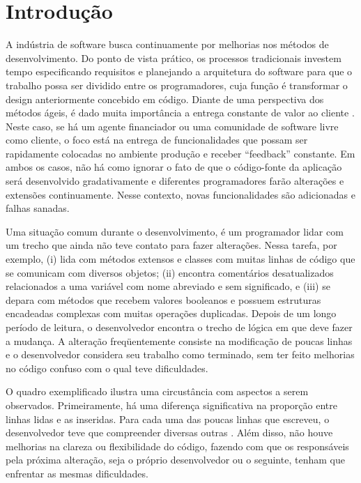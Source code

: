 \chapter{Introdução}
\label{chap:introducao}

A indústria de software busca continuamente por melhorias nos métodos
de desenvolvimento. Do ponto de vista prático, os processos tradicionais investem tempo especificando requisitos
e planejando a arquitetura do software para que o trabalho possa ser dividido entre os
programadores, cuja função é transformar o design anteriormente concebido em código.
%
Diante de uma perspectiva dos métodos ágeis, é dado muita importância a entrega constante 
de valor ao cliente \citep{AgM2001}. Neste caso, se há um agente financiador ou uma comunidade de software livre
como cliente, o foco está na entrega de funcionalidades que possam ser rapidamente colocadas
no ambiente produção e receber ``feedback'' constante.
%
Em ambos os casos, não há como ignorar o fato de que o código-fonte da aplicação será
desenvolvido gradativamente e diferentes programadores farão alterações e extensões
continuamente. Nesse contexto, novas funcionalidades são adicionadas e falhas sanadas.

Uma situação comum durante o desenvolvimento, é um programador lidar com um trecho que
ainda não teve contato para fazer alterações. Nessa tarefa, por exemplo, (i) lida com métodos extensos e classes
com muitas linhas de código que se comunicam com diversos objetos; (ii) encontra comentários
desatualizados relacionados a uma variável com nome abreviado e sem significado, e (iii) se depara com métodos que
recebem valores booleanos e possuem estruturas encadeadas complexas com muitas operações duplicadas.
%
Depois de um longo período de leitura, o desenvolvedor encontra o trecho de lógica em que deve 
fazer a mudança. A alteração freqüentemente consiste na modificação de poucas linhas e o 
desenvolvedor considera seu trabalho como terminado, sem ter feito melhorias no código confuso
com o qual teve dificuldades.

O quadro exemplificado ilustra uma circustância com aspectos a serem observados.
Primeiramente, há uma diferença significativa na proporção entre linhas lidas e as inseridas.
Para cada uma das poucas linhas que escreveu, o desenvolvedor teve que compreender diversas
outras \citep{Beck2007}. Além disso, não houve melhorias na clareza ou flexibilidade do código, fazendo 
com que os responsáveis pela próxima alteração, seja o próprio desenvolvedor ou o seguinte,
tenham que enfrentar as mesmas dificuldades.

